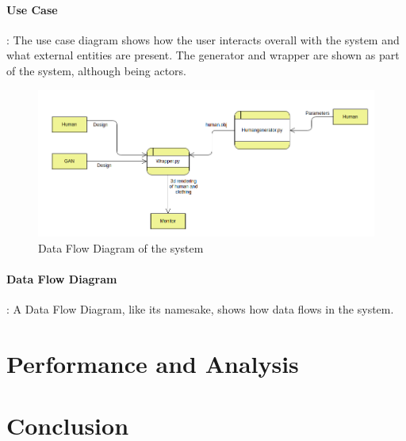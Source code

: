 \documentclass{article}
\begin{document}
\paragraph{Use Case} : The use case diagram shows how the user interacts overall with the system and what external entities are present. The generator and wrapper are shown as part of the system, although being actors.

\begin{figure}[H]
    \includegraphics[scale=0.5]{images/softwareDiagrams/DFD.png}
    \caption{Data Flow Diagram of the system}
\end{figure}

\paragraph{Data Flow Diagram}: A Data Flow Diagram, like its namesake, shows how data flows in the system. 
\section{Performance and Analysis}



\section{Conclusion}
\printbibliography
\end{document}

